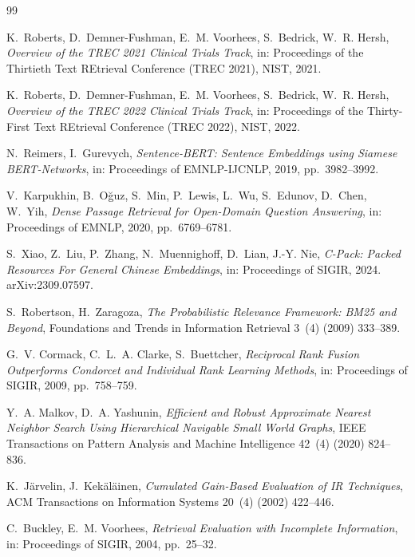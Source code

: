 \documentclass[pdflatex,sn-mathphys-num]{sn-jnl}
\theoremstyle{thmstyleone}
\theoremstyle{thmstyletwo}
\theoremstyle{thmstylethree}
\begin{document}
\begin{thebibliography}{99}

K.~Roberts, D.~Demner-Fushman, E.~M. Voorhees, S.~Bedrick, W.~R. Hersh,
\emph{Overview of the TREC 2021 Clinical Trials Track},
in: Proceedings of the Thirtieth Text REtrieval Conference (TREC 2021), NIST, 2021.

K.~Roberts, D.~Demner-Fushman, E.~M. Voorhees, S.~Bedrick, W.~R. Hersh,
\emph{Overview of the TREC 2022 Clinical Trials Track},
in: Proceedings of the Thirty-First Text REtrieval Conference (TREC 2022), NIST, 2022.

N.~Reimers, I.~Gurevych,
\emph{Sentence-BERT: Sentence Embeddings using Siamese BERT-Networks},
in: Proceedings of EMNLP-IJCNLP, 2019, pp.~3982--3992.

V.~Karpukhin, B.~O\u{g}uz, S.~Min, P.~Lewis, L.~Wu, S.~Edunov, D.~Chen, W.~Yih,
\emph{Dense Passage Retrieval for Open-Domain Question Answering},
in: Proceedings of EMNLP, 2020, pp.~6769--6781.

S.~Xiao, Z.~Liu, P.~Zhang, N.~Muennighoff, D.~Lian, J.-Y. Nie,
\emph{C-Pack: Packed Resources For General Chinese Embeddings},
in: Proceedings of SIGIR, 2024. arXiv:2309.07597.

S.~Robertson, H.~Zaragoza,
\emph{The Probabilistic Relevance Framework: BM25 and Beyond},
Foundations and Trends in Information Retrieval 3~(4) (2009) 333--389.

G.~V. Cormack, C.~L.~A. Clarke, S.~Buettcher,
\emph{Reciprocal Rank Fusion Outperforms Condorcet and Individual Rank Learning Methods},
in: Proceedings of SIGIR, 2009, pp.~758--759.

Y.~A. Malkov, D.~A. Yashunin,
\emph{Efficient and Robust Approximate Nearest Neighbor Search Using Hierarchical Navigable Small World Graphs},
IEEE Transactions on Pattern Analysis and Machine Intelligence 42~(4) (2020) 824--836.

K.~J\"{a}rvelin, J.~Kek\"{a}l\"{a}inen,
\emph{Cumulated Gain-Based Evaluation of IR Techniques},
ACM Transactions on Information Systems 20~(4) (2002) 422--446.

C.~Buckley, E.~M. Voorhees,
\emph{Retrieval Evaluation with Incomplete Information},
in: Proceedings of SIGIR, 2004, pp.~25--32.


\end{thebibliography}
\end{document}
